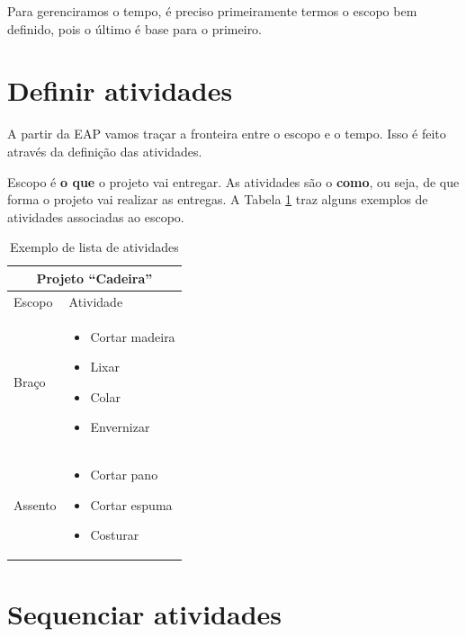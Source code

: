 Para gerenciramos o tempo, é preciso primeiramente termos o escopo bem definido, pois o último é base para o primeiro.

\section{Definir atividades}

A partir da EAP vamos traçar a fronteira entre o escopo e o tempo. Isso é feito através da definição das atividades.

Escopo é \textbf{o que} o projeto vai entregar. As atividades são o \textbf{como}, ou seja, de que forma o projeto vai realizar as entregas. A Tabela \ref{tab:ativ:ex} traz alguns exemplos de atividades associadas ao escopo.

\begin{table}[h!]\footnotesize
\centering
\begin{tabular}
{
 	|p{}
	| >{\centering\arraybackslash}p{}|
}

	\hline

	\multicolumn{2}{c}{Projeto ``Cadeira''}\\
	
	\hline
	
	Escopo&
	Atividade\\
	
	\hline

	Braço&
	\begin{itemize}
		\item Cortar madeira
		\item Lixar
		\item Colar
		\item Envernizar
	\end{itemize}\\
	
	\hline

	Assento&
	\begin{itemize}
		\item Cortar pano
		\item Cortar espuma
		\item Costurar
	\end{itemize}\\

	\hline

\end{tabular}
\caption {Exemplo de lista de atividades}
\label{tab:ativ:ex}
\end{table}

\section{Sequenciar atividades}

